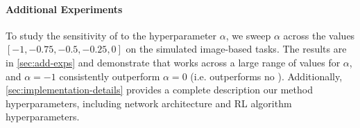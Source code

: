\paragraph{Additional Experiments}
To study the sensitivity of \METHOD to the hyperparameter $\alpha$, we sweep $\alpha$ across the values $[-1, -0.75, -0.5, -0.25, 0]$ on the simulated image-based tasks.
The results are in \autoref{sec:add-exps} and demonstrate that \METHOD works across a large range of values for $\alpha$, and $\alpha=-1$ consistently outperform $\alpha=0$ (i.e. outperforms no \METHOD).
Additionally, \autoref{sec:implementation-details} provides a complete description our method hyperparameters, including network architecture and RL algorithm hyperparameters.